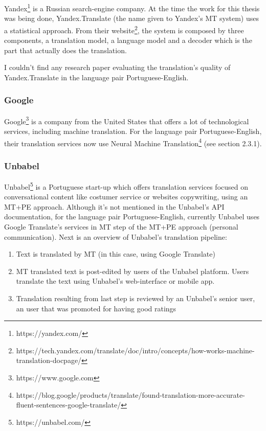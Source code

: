 Yandex\footnote{https://yandex.com/} is a Russian search-engine company. At the time the work for this thesis was being done, Yandex.Translate (the name given to Yandex's MT system) uses a statistical approach. From their website\footnote{https://tech.yandex.com/translate/doc/intro/concepts/how-works-machine-translation-docpage/}, the system is composed by three components, a translation model, a language model and a decoder which is the part that actually does the translation. 

I couldn't find any research paper evaluating the translation's quality of Yandex.Translate in the language pair Portuguese-English.

\subsubsection{Google}

Google\footnote{https://www.google.com} is a company from the United States that offers a lot of technological services, including machine translation. For the language pair Portuguese-English, their translation services now use Neural Machine Translation\footnote{https://blog.google/products/translate/found-translation-more-accurate-fluent-sentences-google-translate/} (see section 2.3.1).

\subsubsection{Unbabel}

Unbabel\footnote{https://unbabel.com/} is a Portuguese start-up which offers translation services focused on conversational content like costumer service or websites copywriting, using an MT+PE approach. Although it's not mentioned in the Unbabel's API documentation, for the language pair Portuguese-English, currently Unbabel uses Google Translate's services in MT step of the MT+PE approach (personal communication). Next is an overview of Unbabel's translation pipeline:

\begin{enumerate}
\item Text is translated by MT (in this case, using Google Translate)
\item MT translated text is post-edited by users of the Unbabel platform. Users translate the text using Unbabel's web-interface or mobile app. 
\item Translation resulting from last step is reviewed by an Unbabel's senior user, an user that was promoted for having good ratings
\end{enumerate}


